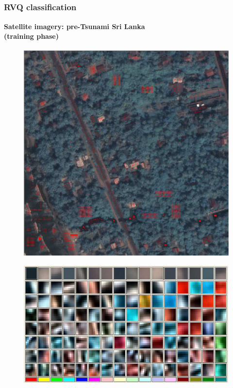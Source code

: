 \begin{frame}
\frametitle{RVQ classification}
\framesubtitle{\small Satellite imagery: pre-Tsunami Sri Lanka \\(training phase)}
\logoCSIPCPL\mypagenum
	\begin{figure}		
		\includegraphics[height=0.35\textheight]{figs/RVQ_SatelliteSriLanka_1_snippets.png}			
	\end{figure}
	\begin{figure}		
		\includegraphics[height=0.40\textheight]{figs/RVQ_SatelliteSriLanka_2_codebooks.png}			
	\end{figure}
\end{frame}




